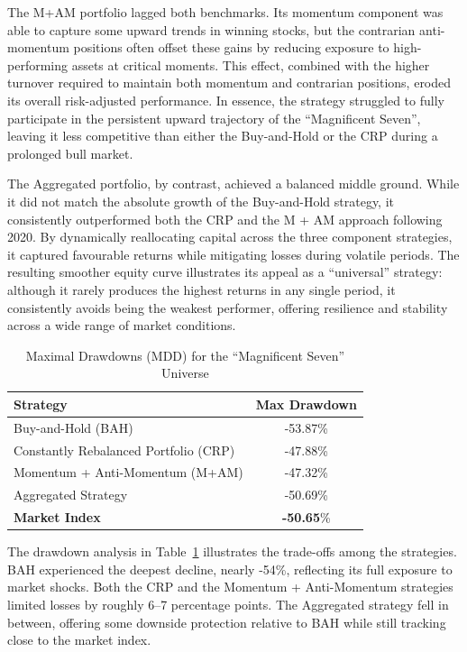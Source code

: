 \documentclass[12pt,a4paper]{report}
\begin{document}
The M+AM portfolio lagged both benchmarks. Its momentum component was able to capture some upward trends in winning stocks, but the contrarian anti-momentum positions often offset these gains by reducing exposure to high-performing assets at critical moments. This effect, combined with the higher turnover required to maintain both momentum and contrarian positions, eroded its overall risk-adjusted performance. In essence, the strategy struggled to fully participate in the persistent upward trajectory of the ``Magnificent Seven'', leaving it less competitive than either the Buy-and-Hold or the CRP during a prolonged bull market.

The Aggregated portfolio, by contrast, achieved a balanced middle ground. While it did not match the absolute growth of the Buy-and-Hold strategy, it consistently outperformed both the CRP and the M + AM approach following 2020. By dynamically reallocating capital across the three component strategies, it captured favourable returns while mitigating losses during volatile periods. The resulting smoother equity curve illustrates its appeal as a “universal” strategy: although it rarely produces the highest returns in any single period, it consistently avoids being the weakest performer, offering resilience and stability across a wide range of market conditions.

\begin{table}[h!]
\centering
\caption{Maximal Drawdowns (MDD) for the ``Magnificent Seven'' Universe}
\label{tab:mdd_best}
\begin{tabular}{lc}
\toprule
\textbf{Strategy} & \textbf{Max Drawdown} \\
\midrule
Buy-and-Hold (BAH) & -53.87\% \\
Constantly Rebalanced Portfolio (CRP) & -47.88\% \\
Momentum + Anti-Momentum (M+AM) & -47.32\% \\
Aggregated Strategy & -50.69\% \\
\textbf{Market Index} & \textbf{-50.65}\% \\
\bottomrule
\end{tabular}
\end{table}

The drawdown analysis in Table~\ref{tab:mdd_best} illustrates the trade-offs among the strategies. BAH experienced the deepest decline, nearly -54\%, reflecting its full exposure to market shocks. Both the CRP and the Momentum + Anti-Momentum strategies limited losses by roughly 6--7 percentage points. The Aggregated strategy fell in between, offering some downside protection relative to BAH while still tracking close to the market index. 
\end{document}
